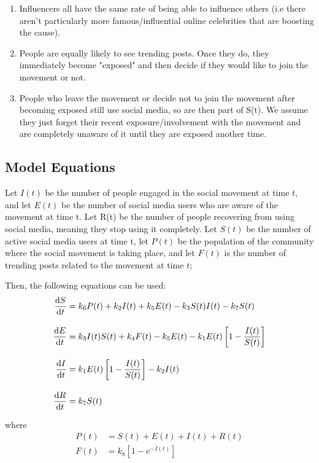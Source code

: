 \documentclass{article}
\begin{document}
\begin{enumerate}
    \item Influencers all have the same rate of being able to influence others (i.e there aren’t particularly more famous/influential online celebrities that are boosting the cause). 

    \item People are equally likely to see trending posts. Once they do, they immediately become "exposed" and then decide if they would like to join the movement or not. 
    
    \item People who leave the movement or decide not to join the movement after becoming exposed still use social media, so are then part of S(t). We assume they just forget their recent exposure/involvement with the movement and are completely unaware of it until they are exposed another time. 
    \end{enumerate}
    \subsection{Model Equations}

     Let $I(t)$ be the number of people engaged in the social movement at time $t$, and let $E(t)$ be the number of social media users who are aware of the movement at time t. Let R(t) be the number of people recovering from using social media, meaning they stop using it completely. Let $S(t)$ be the number of active social media users at time t, let $P(t)$ be the population of the community where the social movement is taking place, and let $F(t)$ is the number of trending posts related to the movement at time $t$;

    Then, the following equations can be used:
    \begin{subequations}
    \begin{align}            
        \diff St &= k_6 P(t) + k_2I(t) + k_5E(t) - k_3 {S(t)I(t)}- k_7S(t)
        \\[10pt]
        \diff Et &= k_3 I(t)S(t) + k_4 F(t) - k_5E(t) - k_1E(t)\left[1 - \frac{I(t)}{S(t)}\right] 
        \\[10pt]
        \diff It &= k_1 E(t) \left[1 - \frac{I(t)}{S(t)}\right] - k_2I(t)
        \\[10pt]
        \diff Rt &= k_7S(t)
    \end{align}
    \end{subequations}
    
    where
    \begin{subequations}
    \begin{align}
        P(t) &= S(t) + E(t) + I(t) + R(t)
        \\[10pt]
        F(t) &= k_8\left[1- e^{-I(t)}\right]
    \end{align}
    \end{subequations}
\end{document}
